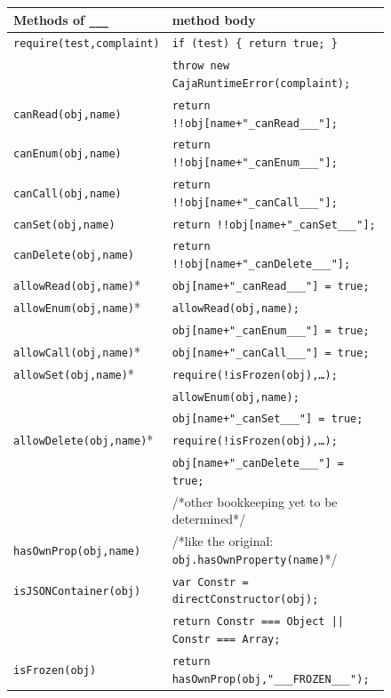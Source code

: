 \documentclass[letterpaper,twocolumn,10pt]{article}
\newcommand{\code}[1]{{\tt {#1}}}              %
\begin{document}
\begin{figure}
\begin{tabular}{ll}
  Methods of \code{\_\_\_}  & method body \\ 
  \hline 
  \code{require(test,complaint)}
       & \code{if (test)\ \{ return true; \}} \\
       & \code{throw new CajaRuntimeError(complaint);} \\
  \hline
  \code{canRead(obj,name)}  
       & \code{return !!obj[name+"\_canRead\_\_\_"];} \\
  \code{canEnum(obj,name)}
       & \code{return !!obj[name+"\_canEnum\_\_\_"];} \\
  \code{canCall(obj,name)}
       & \code{return !!obj[name+"\_canCall\_\_\_"];} \\
  \code{canSet(obj,name)}
       & \code{return !!obj[name+"\_canSet\_\_\_"];} \\
  \code{canDelete(obj,name)}
       & \code{return !!obj[name+"\_canDelete\_\_\_"];} \\
  \hline
  \code{allowRead(obj,name)}* 
       & \code{obj[name+"\_canRead\_\_\_"] = true;} \\
  \code{allowEnum(obj,name)}* 
       & \code{allowRead(obj,name);} \\
       & \code{obj[name+"\_canEnum\_\_\_"] = true;} \\
  \code{allowCall(obj,name)}* 
       & \code{obj[name+"\_canCall\_\_\_"] = true;} \\
  \code{allowSet(obj,name)}* 
       & \code{require(!isFrozen(obj),\ldots);} \\
       & \code{allowEnum(obj,name);} \\
       & \code{obj[name+"\_canSet\_\_\_"] = true;}\\
  \code{allowDelete(obj,name)}* 
       & \code{require(!isFrozen(obj),\ldots);} \\
       & \code{obj[name+"\_canDelete\_\_\_"] = true;} \\
       & /*other bookkeeping yet to be determined*/ \\
  \hline 
  \code{hasOwnProp(obj,name)} 
       & /*like the original: \code{obj.hasOwnProperty(name)}*/ \\
  \code{isJSONContainer(obj)} 
       & \code{var Constr = directConstructor(obj);} \\
       & \code{return Constr === Object || Constr === Array;} \\ 
  \code{isFrozen(obj)} 
       & \code{return hasOwnProp(obj,"\_\_\_FROZEN\_\_\_");} \\

\end{tabular}
\end{figure}
\end{document}
